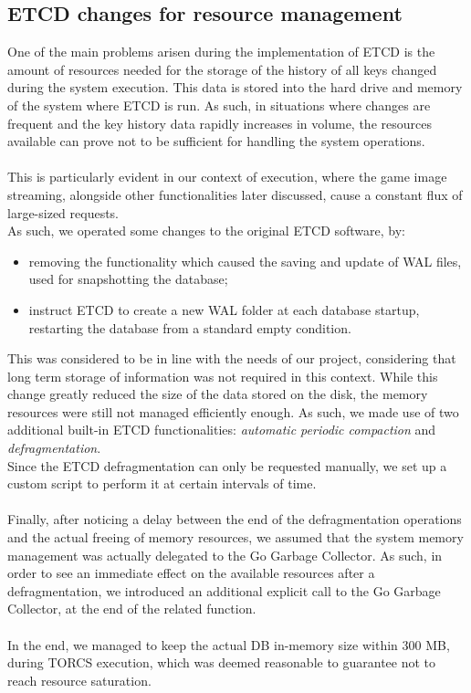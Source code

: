 \subsection{ETCD changes for resource management}\label{etcd-evolution}
One of the main problems arisen during the implementation of ETCD is the amount of resources needed for the storage of the history of all keys changed during the system execution. This data is stored into the hard drive and memory of the system where ETCD is run. As such, in situations where changes are frequent and the key history data rapidly increases in volume, the resources available can prove not to be sufficient for handling the system operations. \\ \\
This is particularly evident in our context of execution, where the game image streaming, alongside other functionalities later discussed, cause a constant flux of large-sized requests. \\
As such, we operated some changes to the original ETCD software, by:
\begin{itemize}
	\item removing the functionality which caused the saving and update of WAL files, used for snapshotting the database;
	\item instruct ETCD to create a new WAL folder at each database startup, restarting the database from a standard empty condition.
\end{itemize}
This was considered to be in line with the needs of our project, considering that long term storage of information was not required in this context. While this change greatly reduced the size of the data stored on the disk, the memory resources were still not managed efficiently enough. As such, we made use of two additional built-in ETCD functionalities: \textit{automatic periodic compaction} and \textit{defragmentation}. \\
Since the ETCD defragmentation can only be requested manually, we set up a custom script to perform it at certain intervals of time. \\ \\
Finally, after noticing a delay between the end of the defragmentation operations and the actual freeing of memory resources, we assumed that the system memory management was actually delegated to the Go Garbage Collector. As such, in order to see an immediate effect on the available resources after a defragmentation, we introduced an additional explicit call to the Go Garbage Collector, at the end of the related function. \\ \\
In the end, we managed to keep the actual DB in-memory size within 300 MB, during TORCS execution, which was deemed reasonable to guarantee not to reach resource saturation.

